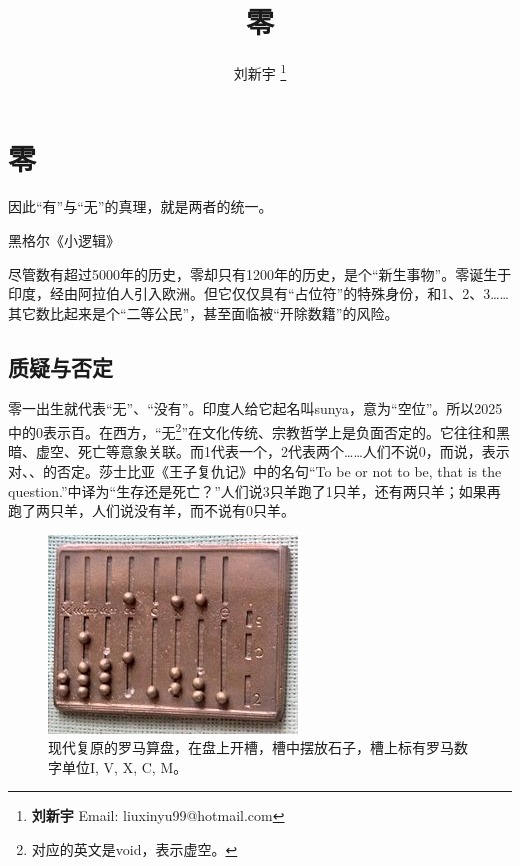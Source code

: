 \documentclass[b5paper]{ctexart}
\begin{document}
\title{零}

\author{刘新宇
\thanks{{\bfseries 刘新宇} \newline
  Email: liuxinyu99@hotmail.com \newline}
  }

\maketitle
\fi


\ifx\wholebook\relax
\chapter{零}
\fi

\epigraph{因此“有”与“无”的真理，就是两者的统一。}{黑格尔《小逻辑》}

尽管数有超过5000年的历史，零却只有1200年的历史，是个“新生事物”。零诞生于印度，经由阿拉伯人引入欧洲。但它仅仅具有“占位符”的特殊身份，和1、2、3……其它数比起来是个“二等公民”，甚至面临被“开除数籍”的风险。

\section{质疑与否定}
零一出生就代表“无”、“没有”。印度人给它起名叫sunya，意为“空位”。所以2025中的0表示百。在西方，“无\footnote{对应的英文是void，表示虚空。}”在文化传统、宗教哲学上是负面否定的。它往往和黑暗、虚空、死亡等意象关联。而1代表一个，2代表两个……人们不说0，而说，表示对、、的否定。莎士比亚《王子复仇记》中的名句“To be or not to be, that is the question.”中译为“生存还是死亡？”人们说3只羊跑了1只羊，还有两只羊；如果再跑了两只羊，人们说没有羊，而不说有0只羊。

\begin{figure}[htbp]
 \centering
 \includegraphics[scale=0.5]{img/Roman-abacus}
 \caption{现代复原的罗马算盘，在盘上开槽，槽中摆放石子，槽上标有罗马数字单位I, V, X, C, M。}
 \label{fig:roman-abacus}
\end{figure}
\end{document}
